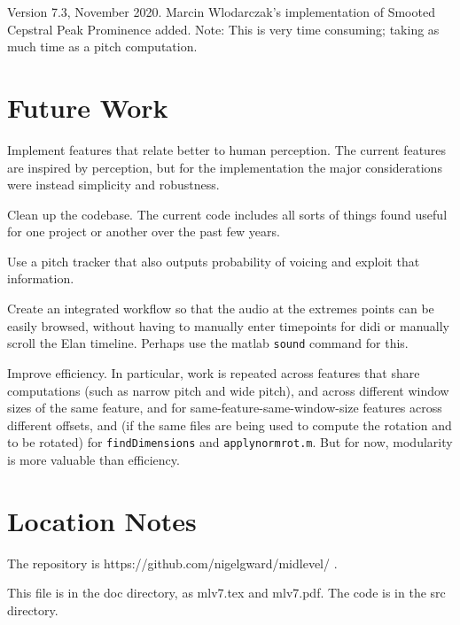 \documentclass[11pt]{article}
\begin{document}
Version 7.3, November 2020.  Marcin Wlodarczak's implementation of
Smooted Cepstral Peak Prominence added.  Note: This is very time
consuming; taking as much time as a pitch computation. 

\section{Future Work}               \label{sec:future}

Implement features that relate better to human perception.  The
current features are inspired by perception, but for the
implementation the major considerations were instead simplicity and
robustness.

Clean up the codebase.  The current code includes all sorts of things
found useful for one project or another over the past few years.

Use a pitch tracker that also outputs probability
of voicing and exploit that information.

Create an integrated workflow so that the audio at the extremes points
can be easily browsed, without having to manually enter timepoints for
didi or manually scroll the Elan timeline.  Perhaps use the matlab
{\tt sound} command for this.

Improve efficiency.  In particular, work is repeated across features
that share computations (such as narrow pitch and wide pitch), and
across different window sizes of the same feature, and for
same-feature-same-window-size features across different offsets, and
(if the same files are being used to compute the rotation and to be
rotated) for {\tt findDimensions} and {\tt applynormrot.m}.  But for
now, modularity is more valuable than efficiency.


%


\section{Location Notes}            \label{sec:location}

The repository is https://github.com/nigelgward/midlevel/ .

This file is in the doc directory, as mlv7.tex and mlv7.pdf.  The code
is in the src directory. 



%

\end{document}
